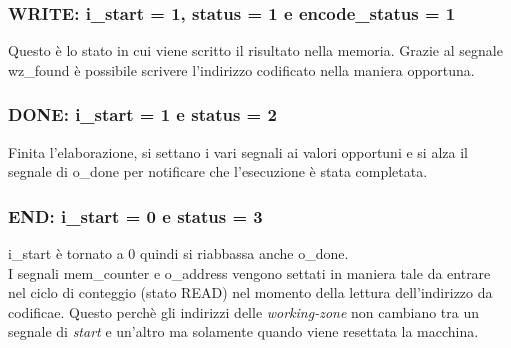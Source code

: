 \documentclass{article}
\begin{document}
\subsubsection{WRITE: {\selectfont i\_start} = 1, {\selectfont status} = 1 e {\selectfont encode\_status} = 1}
Questo è lo stato in cui viene scritto il risultato nella memoria. Grazie al segnale {\selectfont wz\_found} è possibile scrivere l'indirizzo codificato nella maniera opportuna.
\subsubsection{DONE: {\selectfont i\_start} = 1 e {\selectfont status} = 2}
Finita l'elaborazione, si settano i vari segnali ai valori opportuni e si alza il segnale di {\selectfont o\_done} per notificare che l'esecuzione è stata completata.
\subsubsection{END: {\selectfont i\_start} = 0 e {\selectfont status} = 3}
{\selectfont i\_start} è tornato a 0 quindi si riabbassa anche {\selectfont o\_done}.\\
I segnali {\selectfont mem\_counter} e {\selectfont o\_address} vengono settati in maniera tale da entrare nel ciclo di conteggio (stato READ) nel momento della lettura dell'indirizzo da codificae. Questo perchè gli indirizzi delle \textit{working-zone} non cambiano tra un segnale di \textit{start} e un'altro ma solamente quando viene resettata la macchina.
\pagebreak
\end{document}
